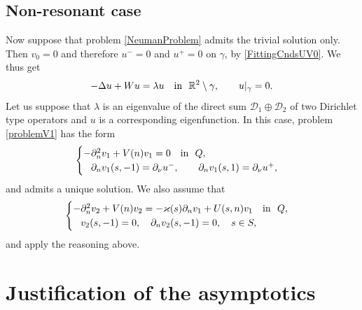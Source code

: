 \documentclass[reqno]{amsart}
\theoremstyle{plain}
\numberwithin{equation}{section}
\renewcommand{\kappa}{\varkappa}
\newcommand{\Real}{\mathbb R}
\newcommand{\pte}{\partial_n}
\begin{document}
\subsection{Non-resonant case}
Now suppose that problem \eqref{NeumanProblem} admits the trivial solution only.  Then $v_0=0$ and therefore $u^-=0$ and $u^+=0$ on $\gamma$, by \eqref{FittingCndsUV0}. We thus get
\begin{equation*}
-\Delta u+Wu=\lambda u\quad \hbox{in \ } \Real^2\setminus \gamma,\qquad
 u|_{\gamma}=0.
\end{equation*}
Let us suppose that $\lambda$ is an eigenvalue of the direct sum
$\mathcal{D}_1\oplus\mathcal{D}_2$ of two Dirichlet type operators and $u$ is a corresponding eigenfunction.
In this case, problem \eqref{problemV1} has the form
\begin{equation}\label{problemV1Non}
\begin{cases}
    -\pte^2 v_1+V(n)v_1=0\quad \hbox{in \ } Q, \\
    \phantom{-}\partial_n v_1(s, -1)=\partial_\nu u^-, \qquad
\partial_n v_1(s, 1)=\partial_\nu u^+,
\end{cases}
\end{equation}
and admits a unique solution. We also assume that
\begin{equation*}
\begin{cases}
-\pte^2 v_2+V(n)v_2=-\kappa(s)\pte v_1 +U(s,n) v_1
  \quad \hbox{in \ } Q,
\\
   \phantom{-} v_2(s, -1)=0,
 \quad
 \partial_n v_2(s, -1)=0, \quad s\in S,
\end{cases}
\end{equation*}
and apply the reasoning above.



\section{Justification of the asymptotics}
\end{document}
